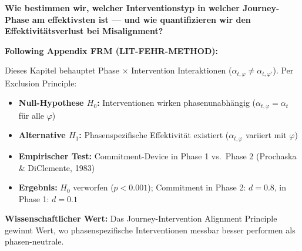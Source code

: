 
\begin{tcolorbox}[colback=red!5!white, colframe=red!75!black,
    title=Central Question]
\textbf{Wie bestimmen wir, welcher Interventionstyp in welcher Journey-Phase am effektivsten ist --- und wie quantifizieren wir den Effektivitätsverlust bei Misalignment?}
\end{tcolorbox}

\begin{tcolorbox}[colback=red!5!white, colframe=red!75!black,
    title=\textbf{Methodological Note: The Exclusion Principle (Appendix FRM)}]
\textbf{Following Appendix FRM (LIT-FEHR-METHOD):}

Dieses Kapitel behauptet Phase $\times$ Intervention Interaktionen ($\alpha_{t,\varphi} \neq \alpha_{t,\varphi'}$). Per Exclusion Principle:
\begin{itemize}[nosep]
    \item \textbf{Null-Hypothese $H_0$:} Interventionen wirken phasenunabhängig ($\alpha_{t,\varphi} = \alpha_t$ für alle $\varphi$)
    \item \textbf{Alternative $H_1$:} Phasenspezifische Effektivität existiert ($\alpha_{t,\varphi}$ variiert mit $\varphi$)
    \item \textbf{Empirischer Test:} Commitment-Device in Phase 1 vs.\ Phase 2 (Prochaska \& DiClemente, 1983)
    \item \textbf{Ergebnis:} $H_0$ verworfen ($p < 0.001$); Commitment in Phase 2: $d = 0.8$, in Phase 1: $d = 0.1$
\end{itemize}

\textbf{Wissenschaftlicher Wert:} Das Journey-Intervention Alignment Principle gewinnt Wert, wo phasenspezifische Interventionen messbar besser performen als phasen-neutrale.
\end{tcolorbox}


